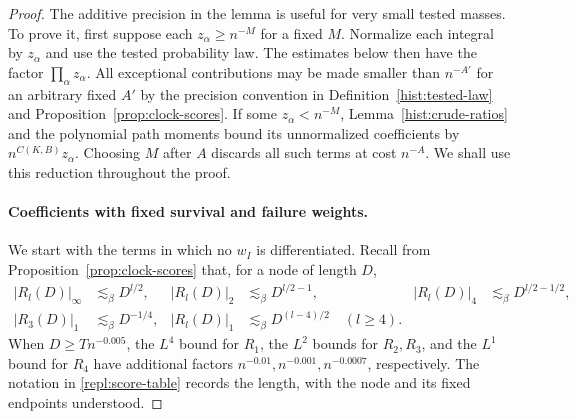 \begin{proof}
The additive precision in the lemma is useful for very small tested
masses.  To prove it, first suppose each $z_\alpha\ge n^{-M}$ for a fixed
$M$.  Normalize each integral by $z_\alpha$ and use the tested probability
law.  The estimates below then have the factor $\prod_\alpha z_\alpha$.
All exceptional contributions may be made smaller than $n^{-A'}$ for an
arbitrary fixed $A'$ by the precision convention in
Definition~\ref{hist:tested-law} and Proposition~\ref{prop:clock-scores}.  If some $z_\alpha<n^{-M}$,
Lemma~\ref{hist:crude-ratios} and the polynomial path moments bound its
unnormalized coefficients by $n^{C(K,B)}z_\alpha$.  Choosing $M$ after $A$
discards all such terms at cost $n^{-A}$.  We shall use this reduction
throughout the proof.

\paragraph{Coefficients with fixed survival and failure weights.}
We start with the terms in which no $w_I$ is differentiated.  Recall from
Proposition~\ref{prop:clock-scores} that, for a node of length $D$,
\begin{equation}\label{repl:score-table}
\begin{aligned}
 |R_l(D)|_\infty&\lesssim_\beta D^{l/2},&
 |R_l(D)|_2&\lesssim_\beta D^{l/2-1},&
 |R_l(D)|_4&\lesssim_\beta D^{l/2-1/2},\\
 |R_3(D)|_1&\lesssim_\beta D^{-1/4},&
 |R_l(D)|_1&\lesssim_\beta D^{(l-4)/2}\quad(l\ge4).
\end{aligned}
\end{equation}
When $D\ge Tn^{-0.005}$, the $L^4$ bound for $R_1$, the $L^2$ bounds for
$R_2,R_3$, and the $L^1$ bound for $R_4$ have additional factors
$n^{-0.01},n^{-0.001},n^{-0.0007}$, respectively.  The notation in
\eqref{repl:score-table} records the length, with the node and its fixed
endpoints understood.


\end{proof}
